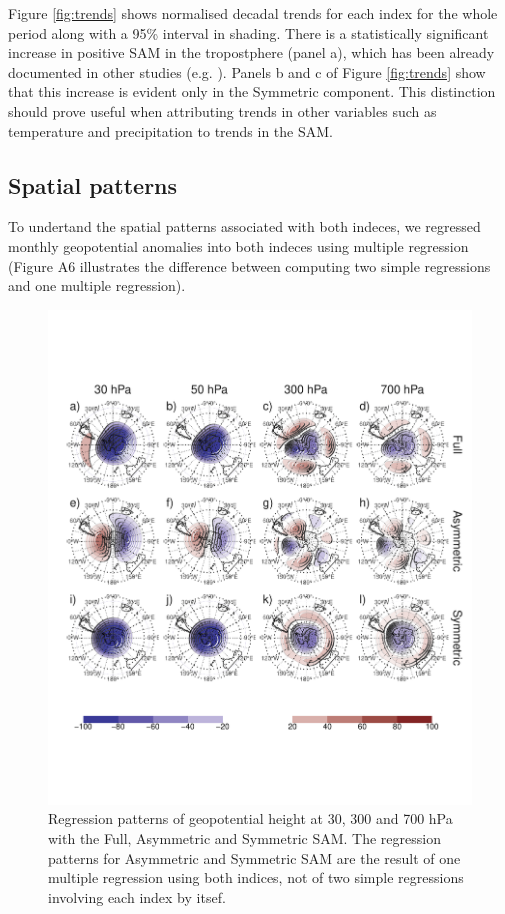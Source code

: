 \documentclass[]{ametsocV5}
\begin{document}
Figure \ref{fig:trends} shows normalised decadal trends for each index
for the whole period along with a 95\% interval in shading. There is a
statistically significant increase in positive SAM in the tropostphere
(panel a), which has been already documented in other studies (e.g.
\citet{fogt2020}). Panels b and c of Figure \ref{fig:trends} show that
this increase is evident only in the Symmetric component. This
distinction should prove useful when attributing trends in other
variables such as temperature and precipitation to trends in the SAM.

\subsection{Spatial patterns}

To undertand the spatial patterns associated with both indeces, we
regressed monthly geopotential anomalies into both indeces using
multiple regression (Figure A6 illustrates the difference between
computing two simple regressions and one multiple regression).

\begin{figure}
\includegraphics{2d-regr-1} \caption[Regression patterns of geopotential height at 30, 300 and 700 hPa with the Full, Asymmetric and Symmetric SAM]{Regression patterns of geopotential height at 30, 300 and 700 hPa with the Full, Asymmetric and Symmetric SAM. The regression patterns for Asymmetric and Symmetric SAM are the result of one multiple regression using both indices, not of two simple regressions involving each index by itsef.}\label{fig:2d-regr}
\end{figure}
\end{document}

